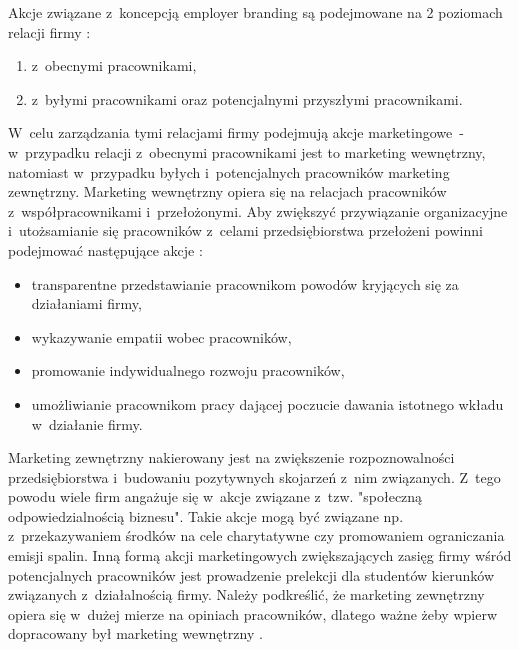 Akcje związane z~koncepcją employer branding są podejmowane na 2 poziomach relacji firmy \cite{spychala-2019}:
\begin{enumerate}
    \item z~obecnymi pracownikami,
    \item z~byłymi pracownikami oraz potencjalnymi przyszłymi pracownikami.
\end{enumerate}

W~celu zarządzania tymi relacjami firmy podejmują akcje marketingowe~- w~przypadku relacji z~obecnymi pracownikami jest to marketing wewnętrzny,
natomiast w~przypadku byłych i~potencjalnych pracowników marketing zewnętrzny.
Marketing wewnętrzny opiera się na relacjach pracowników z~współpracownikami i~przełożonymi.
Aby zwiększyć przywiązanie organizacyjne i~utożsamianie się pracowników z~celami przedsiębiorstwa przełożeni powinni podejmować następujące akcje \cite{spychala-2019}:
\begin{itemize}
    \item transparentne przedstawianie pracownikom powodów kryjących się za działaniami firmy,
    \item wykazywanie empatii wobec pracowników,
    \item promowanie indywidualnego rozwoju pracowników,
    \item umożliwianie pracownikom pracy dającej poczucie dawania istotnego wkładu w~działanie firmy.
\end{itemize}

Marketing zewnętrzny nakierowany jest na zwiększenie rozpoznowalności przedsiębiorstwa i~budowaniu pozytywnych skojarzeń z~nim związanych.
Z~tego powodu wiele firm angażuje się w~akcje związane z~tzw. "społeczną odpowiedzialnością biznesu".
Takie akcje mogą być związane np. z~przekazywaniem środków na cele charytatywne czy promowaniem ograniczania emisji spalin.
Inną formą akcji marketingowych zwiększających zasięg firmy wśród potencjalnych pracowników jest prowadzenie prelekcji dla studentów kierunków związanych z~działalnością firmy.
Należy podkreślić, że marketing zewnętrzny opiera się w~dużej mierze na opiniach pracowników, dlatego ważne żeby wpierw dopracowany był marketing wewnętrzny \cite{spychala-2019}.

